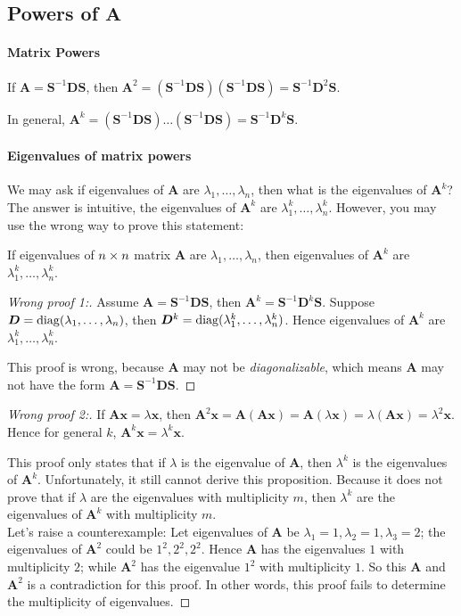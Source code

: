 \subsection[Powers of $A$]{Powers of $\bm A$}
\paragraph{Matrix Powers}
If $\bm A=\bm S^{-1}\bm D\bm S$, then $\bm A^2=(\bm S^{-1}\bm D\bm S)(\bm S^{-1}\bm D\bm S)=\bm S^{-1}\bm D^2\bm S$.

In general, $\bm A^k=(\bm S^{-1}\bm D\bm S)\dots(\bm S^{-1}\bm D\bm S)=\bm S^{-1}\bm D^k\bm S$.
\paragraph{Eigenvalues of matrix powers}
We may ask if eigenvalues of $\bm A$ are $\lambda_1,\dots,\lambda_n$, then what is the eigenvalues of $\bm A^k$? The answer is intuitive, the eigenvalues of $\bm A^k$ are $\lambda_1^k,\dots,\lambda_n^k$. However, you may use the wrong way to prove this statement:
\begin{proposition}\label{Prop:7:7}
If eigenvalues of $n\times n$ matrix $\bm A$ are $\lambda_1,\dots,\lambda_n$, then eigenvalues of $\bm A^{k}$ are $\lambda_1^k,\dots,\lambda_n^k$.
\end{proposition}
\begin{proof}[Wrong proof 1:]
Assume $\bm A=\bm S^{-1}\bm D\bm S$, then $\bm A^{k}=\bm S^{-1}\bm D^{k}\bm S$. Suppose $\bm D=\operatorname{diag}(\lambda_1,\dots,\lambda_n)$, then $\bm D^{k}=\operatorname{diag}(\lambda_1^k,\dots,\lambda_n^k)$. Hence eigenvalues of $\bm A^{k}$ are $\lambda_1^k,\dots,\lambda_n^k$.

This proof is wrong, because $\bm A$ may not be \textit{diagonalizable}, which means $\bm A$ may not have the form $\bm A=\bm S^{-1}\bm D\bm S$.
\end{proof}
\begin{proof}[Wrong proof 2:]
If $\bm{Ax}=\lambda\bm x$, then $\bm A^2\bm x=\bm A(\bm A\bm x)=\bm A(\lambda\bm x)=\lambda(\bm{Ax})=\lambda^2\bm x$.\\
Hence for general $k$, $\bm A^k\bm x=\lambda^k\bm x$.

This proof only states that if $\lambda$ is the eigenvalue of $\bm A$, then $\lambda^k$ is the eigenvalues of $\bm A^k$. Unfortunately, it still cannot derive this proposition. Because it does not prove that if $\lambda$ are the eigenvalues with multiplicity $m$, then $\lambda^k$ are the eigenvalues of $\bm A^k$ with multiplicity $m$.
\\ 
Let's raise a counterexample: Let eigenvalues of $\bm A$ be $\lambda_1=1,\lambda_2=1,\lambda_3=2$; the eigenvalues of $\bm A^2$ could be $1^2,2^2,2^2$.  Hence $\bm A$ has the eigenvalues $1$ with multiplicity $2$; while $\bm A^2$ has the eigenvalue $1^2$ with multiplicity $1$. So this $\bm A$ and $\bm A^2$ is a contradiction for this proof. In other words, this proof fails to determine the multiplicity of eigenvalues.
\end{proof}
